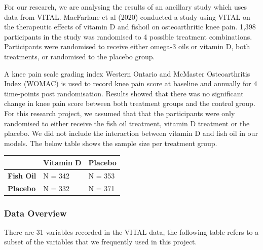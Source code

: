 \documentclass{article}
\begin{document}
For our research, we are analysing the results of an ancillary study
which uses data from VITAL. MacFarlane et al (2020) conducted a study
using VITAL on the therapeutic effects of vitamin D and fishoil on
osteoarthritic knee pain. 1,398 participants in the study was randomised
to 4 possible treatment combinations. Participants were randomised to
receive either omega-3 oils or vitamin D, both treatments, or randomised
to the placebo group.

A knee pain scale grading index Western Ontario and McMaster
Osteoarthritis Index (WOMAC) is used to record knee pain score at
baseline and annually for 4 time-points post randomisation. Results
showed that there was no significant change in knee pain score between
both treatment groups and the control group. For this research project,
we assumed that that the participants were only randomised to either
receive the fish oil treatment, vitamin D treatment or the placebo. We
did not include the interaction between vitamin D and fish oil in our
models. The below table shows the sample size per treatment group.

\begin{longtable}[]{@{}lll@{}}
\toprule\noalign{}
& \textbf{Vitamin D} & \textbf{Placebo} \\
\midrule\noalign{}
\endhead
\bottomrule\noalign{}
\endlastfoot
\textbf{Fish Oil} & N = 342 & N = 353 \\
\textbf{Placebo} & N = 332 & N = 371 \\
\end{longtable}

\subsubsection{Data Overview}\label{data-overview-1}

There are 31 variables recorded in the VITAL data, the following table
refers to a subset of the variables that we frequently used in this
project.
\end{document}
